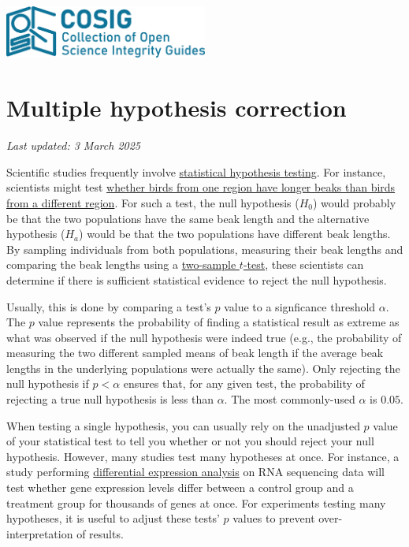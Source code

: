 \documentclass[letterpaper, 12pt]{article}
\begin{document}
\flushleft
\includegraphics[width=0.5\textwidth]{img/home/241017_final_logo_mockup.png}

\section*{Multiple hypothesis correction}
\textit{Last updated: 3 March 2025}

Scientific studies frequently involve \href{https://www.britannica.com/science/statistics/Hypothesis-testing}{statistical hypothesis testing}. For instance, scientists might test \href{https://doi.org/10.1038/s41598-023-49623-y}{whether birds from one region have longer beaks than birds from a different region}. For such a test, the null hypothesis ($H_0$) would probably be that the two populations have the same beak length and the alternative hypothesis ($H_a$) would be that the two populations have different beak lengths. By sampling individuals from both populations, measuring their beak lengths and comparing the beak lengths using a \href{https://en.wikipedia.org/wiki/Student%27s_t-test}{two-sample $t$-test}, these scientists can determine if there is sufficient statistical evidence to reject the null hypothesis. 

Usually, this is done by comparing a test's $p$ value to a signficance threshold $\alpha$. The $p$ value represents the probability of finding a statistical result as extreme as what was observed if the null hypothesis were indeed true (e.g., the probability of measuring the two different sampled means of beak length if the average beak lengths in the underlying populations were actually the same). Only rejecting the null hypothesis if $p < \alpha$ ensures that, for any given test, the probability of rejecting a true null hypothesis is less than $\alpha$. The most commonly-used $\alpha$ is $0.05$.

When testing a single hypothesis, you can usually rely on the unadjusted $p$ value of your statistical test to tell you whether or not you should reject your null hypothesis. However, many studies test many hypotheses at once. For instance, a study performing \href{https://www.ebi.ac.uk/training/online/courses/functional-genomics-ii-common-technologies-and-data-analysis-methods/rna-sequencing/performing-a-rna-seq-experiment/data-analysis/differential-gene-expression-analysis/#:~:text=Differential%20expression%20analysis%20means%20taking,expression%20levels%20between%20experimental%20groups}{differential expression analysis} on RNA sequencing data will test whether gene expression levels differ between a control group and a treatment group for thousands of genes at once. For experiments testing many hypotheses, it is useful to adjust these tests' $p$ values to prevent over-interpretation of results.
\end{document}
